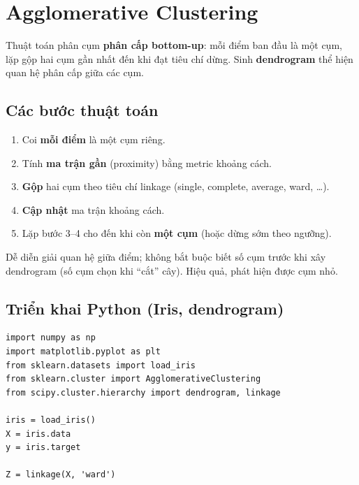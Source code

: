 \section{Agglomerative Clustering}
\label{sec:agglomerative}

\begin{dinhnghia}[title={Agglomerative Clustering}]
Thuật toán phân cụm \textbf{phân cấp bottom-up}: mỗi điểm ban đầu là một cụm, lặp gộp hai cụm gần nhất đến khi đạt tiêu chí dừng.
Sinh \textbf{dendrogram} thể hiện quan hệ phân cấp giữa các cụm.
\end{dinhnghia}

\subsection{Các bước thuật toán}

\begin{phuongphap}[title={Các bước}]
\begin{enumerate}
  \item Coi \textbf{mỗi điểm} là một cụm riêng.
  \item Tính \textbf{ma trận gần} (proximity) bằng metric khoảng cách.
  \item \textbf{Gộp} hai cụm theo tiêu chí linkage (single, complete, average, ward, \ldots).
  \item \textbf{Cập nhật} ma trận khoảng cách.
  \item Lặp bước 3--4 cho đến khi còn \textbf{một cụm} (hoặc dừng sớm theo ngưỡng).
\end{enumerate}
\end{phuongphap}

\begin{ynghia}[title={Vì sao dùng Agglomerative?}]
Dễ diễn giải quan hệ giữa điểm; không bắt buộc biết số cụm trước khi xây dendrogram (số cụm chọn khi ``cắt'' cây).
Hiệu quả, phát hiện được cụm nhỏ.
\end{ynghia}

\subsection{Triển khai Python (Iris, dendrogram)}

\begin{vidu}[title={Nạp Iris và linkage ward}]
\begin{lstlisting}
import numpy as np
import matplotlib.pyplot as plt
from sklearn.datasets import load_iris
from sklearn.cluster import AgglomerativeClustering
from scipy.cluster.hierarchy import dendrogram, linkage

iris = load_iris()
X = iris.data
y = iris.target

Z = linkage(X, 'ward')
\end{lstlisting}
\end{vidu}

